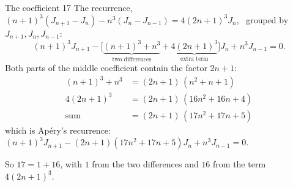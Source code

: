 \documentclass[aspectratio=169,11pt]{beamer}
\begin{document}
\begin{frame}{The coefficient 17}
  The recurrence, \ $(n+1)^3(J_{n+1}-J_n)-n^3(J_n-J_{n-1})=4(2n+1)^3J_n$, \ grouped by $J_{n+1},J_n,J_{n-1}$:
  \[
    (n+1)^3J_{n+1}-\bigl[\underbrace{(n+1)^3+n^3}_{\text{two differences}}+\underbrace{4(2n+1)^3}_{\text{extra term}}\bigr]J_n+n^3J_{n-1}=0 .
  \]
  Both parts of the middle coefficient contain the factor $2n+1$:
  \[
    \begin{aligned}
      (n+1)^3+n^3&=(2n+1)\,(n^2+n+1)\\
      4(2n+1)^3&=(2n+1)\,(16n^2+16n+4)\\
      \text{sum}&=(2n+1)\,(17n^2+17n+5)
    \end{aligned}
  \]
  which is Ap\'ery's recurrence:
  \ $(n+1)^3J_{n+1}-(2n+1)(17n^2+17n+5)J_n+n^3J_{n-1}=0$.
  \medskip

  So $17=1+16$, with $1$ from the two differences and $16$ from the term $4(2n+1)^3$.
\end{frame}
\end{document}
